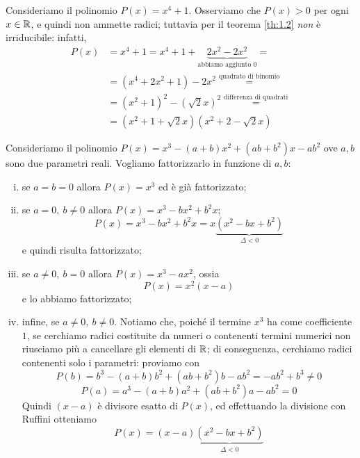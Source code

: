     \begin{example}
        Consideriamo il polinomio $P(x) = x^4+1$. Osserviamo che $P(x)>0$ per ogni $x\in\amsbb{R}$, e quindi non ammette radici; tuttavia per il teorema \ref{th:1.2} \emph{non} è irriducibile: infatti,
        \[
        \begin{split}
                P(x) &= x^4+1 =x^4+1+\underbrace{2x^2-2x^2}_{\text{abbiamo aggiunto 0}} = \\
                & = (x^4+2x^2+1)-2x^2 \overset{\text{quadrato di binomio}}{=} \\
                &= (x^2+1)^2 - (\sqrt{2}x)^2 \overset{\text{differenza di quadrati}}{=} \\
                & = (x^2 + 1 + \sqrt{2}x)(x^2 + 2 -\sqrt{2}x)
        \end{split}
        \]
    \end{example}
    \begin{example}
        Consideriamo il polinomio $P(x) = x^3 -(a+b)x^2+(ab+b^2)x-ab^2$ ove $a,b$ sono due parametri reali. Vogliamo fattorizzarlo in funzione di $a,b$:
        \begin{enumerate}[(i)]
            \item se $a=b=0$ allora $P(x) = x^3$ ed è già fattorizzato;
            \item se $a=0, \ b\ne 0$ allora $P(x) = x^3-bx^2+b^2x$;
            \[
            P(x) = x^3-bx^2+b^2x = x\underbrace{(x^2-bx+b^2)}_{\Delta<0}
            \]
            e quindi risulta fattorizzato;
            \item se $a\ne0, \ b=0$ allora $P(x) = x^3-ax^2$, ossia 
            \[
            P(x) = x^2(x-a)
            \]
            e lo abbiamo fattorizzato;
            \item infine, se $a\ne0, \ b\ne 0$. Notiamo che, poiché il termine $x^3$ ha come coefficiente $1$, se cerchiamo radici costituite da numeri o contenenti termini numerici non riusciamo più a cancellare gli elementi di $\amsbb{R}$; di conseguenza, cerchiamo radici contenenti solo i parametri: proviamo con
            \[
            P(b) = b^3-(a+b)b^2+(ab+b^2)b-ab^2 = -ab^2 + b^3 \ne 0
            \]
            \[
            P(a) = a^3 -(a+b)a^2 +(ab+b^2)a -ab^2 = 0
            \]
            Quindi $(x-a)$ è divisore esatto di $P(x)$, ed effettuando la divisione con Ruffini otteniamo
            \[
            P(x) = (x-a)\underbrace{(x^2-bx+b^2)}_{\Delta<0}
            \]
        \end{enumerate}
    \end{example}
